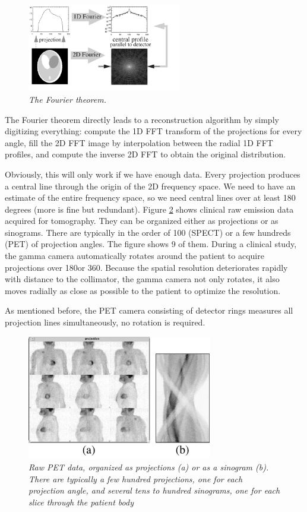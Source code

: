 \documentclass[11pt,oneside]{article}
\begin{document}
\begin{figure}[tb]
\centering
\includegraphics[width=0.6\textwidth]{figs/fig_fouriertheorem.pdf}
\caption{\emph{The Fourier theorem.}}
\label{fig:fouriertheorem} 
\end{figure}

The Fourier theorem directly leads to a reconstruction algorithm by simply
digitizing everything: compute the 1D FFT transform of the projections for
every angle, fill the 2D FFT image by interpolation between the radial 1D FFT
profiles, and compute the inverse 2D FFT to obtain the original distribution.

Obviously, this will only work if we have enough data. Every projection
produces a central line through the origin of the 2D frequency space. We need
to have an estimate of the entire frequency space, so we need central lines
over at least 180 degrees (more is fine but redundant).  Figure
\ref{fig:jnproj_sino} shows clinical raw emission data acquired for
tomography. They can be organized either as projections or as
sinograms. There are typically in the order of 100 (SPECT) or a few hundreds
(PET) of projection angles. The figure shows 9 of them. During a clinical
study, the gamma camera automatically rotates around the patient to acquire
projections over 180\textdegree or 360\textdegree. Because the spatial resolution
deteriorates rapidly with distance to the collimator, the gamma camera not
only rotates, it also moves radially as close as possible to the patient to
optimize the resolution.

As mentioned before, the PET camera consisting of detector rings measures all
projection lines simultaneously, no rotation is required.

\begin{figure}[tb]
\centering
\includegraphics[width=0.72\textwidth]{figs/fig_jnproj_sino.pdf}
\caption{\label{fig:jnproj_sino} \emph{Raw PET data, organized as projections
(a) or as a sinogram (b). There are typically a few hundred projections, one
for each projection angle, and several tens to hundred sinograms, one
for each slice through the patient body}}
\end{figure}
\end{document}

